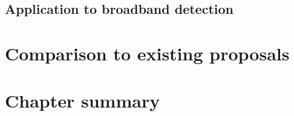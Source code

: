 



\subsection{Application to broadband detection}


\section{Comparison to existing proposals}



\section{Chapter summary}



